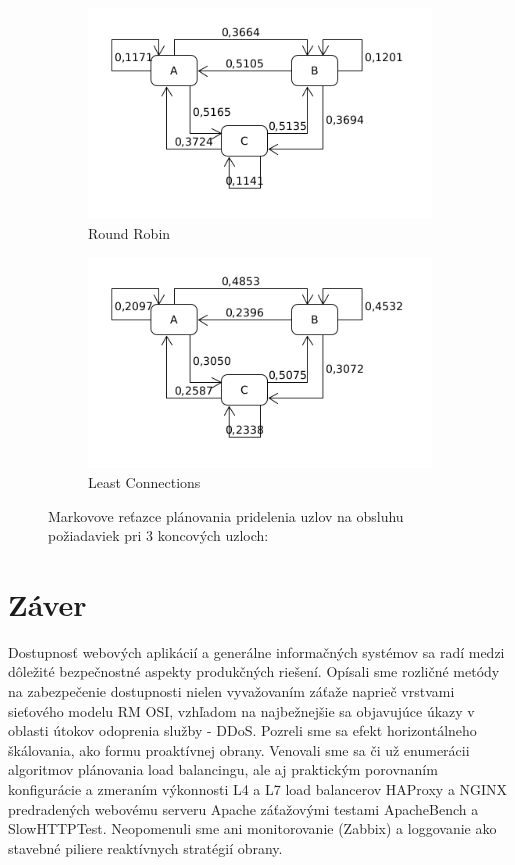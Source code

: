 \documentclass[12pt, a4paper]{article}
\begin{document}
\begin{figure}[h!]
	\centering
	\begin{subfigure}[t]{.48\textwidth}
  		\centering
  		\includegraphics[width=\textwidth]{images/10000-3-RR.png}
  		\caption{Round Robin}
	\end{subfigure}
	\begin{subfigure}[t]{.48\textwidth}
  		\centering
  		\includegraphics[width=\textwidth]{images/10000-3-LC.png}
  		\caption{Least Connections}
	\end{subfigure}
	\caption{Markovove reťazce plánovania pridelenia uzlov na obsluhu požiadaviek
	pri 3 koncových uzloch: \usebox{\shield}
	}
	\label{markov-3}
\end{figure}

\section{Záver}
Dostupnosť webových aplikácií a generálne informačných systémov sa radí medzi dôležité
bezpečnostné aspekty produkčných riešení. Opísali sme rozličné metódy na zabezpečenie
dostupnosti nielen vyvažovaním záťaže naprieč vrstvami sieťového modelu RM OSI, vzhľadom
na najbežnejšie sa objavujúce úkazy v oblasti útokov odoprenia služby - DDoS. 
Pozreli sme sa efekt horizontálneho škálovania, ako formu proaktívnej obrany. Venovali sme sa či už
enumerácii algoritmov plánovania 
load balancingu, ale aj praktickým porovnaním konfigurácie a zmeraním výkonnosti L4 a L7 
load balancerov HAProxy a NGINX predradených webovému serveru Apache záťažovými testami ApacheBench a 
SlowHTTPTest. Neopomenuli sme ani monitorovanie (Zabbix) a loggovanie ako stavebné piliere reaktívnych 
stratégií obrany.
\end{document}
